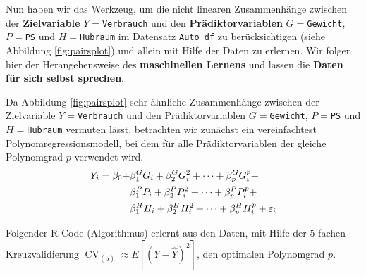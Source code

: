 \documentclass[
  ngerman,
]{book}
\begin{document}
Nun haben wir das Werkzeug, um die nicht linearen Zusammenhänge zwischen der \textbf{Zielvariable} \(Y=\)\texttt{Verbrauch} und den \textbf{Prädiktorvariablen} \(G=\)\texttt{Gewicht}, \(P=\)\texttt{PS} und \(H=\)\texttt{Hubraum} im Datensatz \texttt{Auto\_df} zu berücksichtigen (siehe Abbildung \ref{fig:pairsplot}) und allein mit Hilfe der Daten zu erlernen. Wir folgen hier der Herangehensweise des \textbf{maschinellen Lernens} und lassen die \textbf{Daten für sich selbst sprechen}.

Da Abbildung \ref{fig:pairsplot} sehr ähnliche Zusammenhänge zwischen der Zielvariable \(Y=\)\texttt{Verbrauch} und den Prädiktorvariablen \(G=\)\texttt{Gewicht}, \(P=\)\texttt{PS} und \(H=\)\texttt{Hubraum} vermuten lässt, betrachten wir zunächst ein vereinfachtest Polynomregressionsmodell, bei dem für alle Prädiktorvariablen der gleiche Polynomgrad \(p\) verwendet wird.\\
\begin{align*}
Y_i = \beta_0 + \notag
& \beta^G_{1} G_i + \beta^G_{2} G_i^2 + \dots + \beta^G_{p} G_i^p + \\
& \beta^P_{1} P_i + \beta^P_{2} P_i^2 + \dots + \beta^P_{p} P_i^p +  \\
& \beta^H_{1} H_i + \beta^H_{2} H_i^2 + \dots + \beta^H_{p} H_i^p +  \varepsilon_i 
\end{align*}

Folgender R-Code (Algorithmus) erlernt aus den Daten, mit Hilfe der \(5\)-fachen Kreuzvalidierung \(\operatorname{CV}_{(5)}\approx E[(Y-\hat{Y})^2]\), den optimalen Polynomgrad \(p\).
\end{document}
